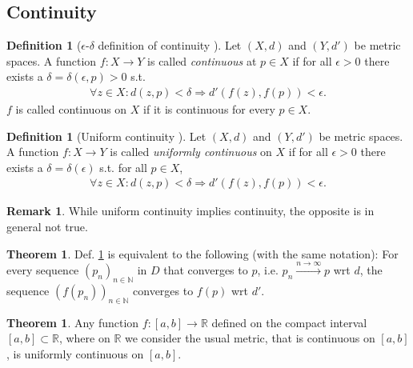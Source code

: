 \documentclass[12pt, a4paper]{article}
\numberwithin{equation}{section}
\theoremstyle{definition}
\theoremstyle{definition}
\newtheorem{defn}[thm]{Definition} %
\newtheorem{remark}[thm]{Remark} %
\newtheorem{theorem}[thm]{Theorem}
\newcommand{\seq}[1][\varphi]{\left( #1 \right)_{n \in \mathbb{N}}}
\begin{document}
	\newpage 
	\subsection{Continuity}
	\begin{defn}[$\epsilon$-$\delta$ definition of continuity \cite{MfPI}]\label{defn:continuity}
		Let $(X, d)$ and $(Y, d')$ be metric spaces. A function $f: X\rightarrow Y$ is called \textit{continuous} at $p\in X$ if for all $\epsilon > 0$ there exists a $\delta = \delta(\epsilon, p) > 0$ s.t. 
		\begin{align}
			\forall z\in X: d\left(z, p\right) < \delta \Rightarrow d'\left( f\left(z\right), f\left(p\right) \right) < \epsilon.  
		\end{align}
		$f$ is called continuous on $X$ if it is continuous for every $p\in X$.
	\end{defn}

	\begin{defn}[Uniform continuity \cite{src:uniform_continuity}]
		Let $(X, d)$ and $(Y, d')$ be metric spaces. A function $f: X\rightarrow Y$ is called \textit{uniformly continuous} on $X$ if for all $\epsilon > 0$ there exists a $\delta = \delta(\epsilon)$ s.t. for all $p\in X$,
		\begin{align}
			\forall z\in X: d\left(z, p\right) < \delta \Rightarrow d'\left( f\left(z\right), f\left(p\right) \right) < \epsilon.
		\end{align}
	\end{defn}

	\begin{remark}
		While uniform continuity implies continuity, the opposite is in general not true.
	\end{remark}

	\begin{theorem}
		Def. \ref{defn:continuity} is equivalent to the following (with the same notation): For every sequence $\seq[p_n]$ in $D$ that converges to $p$, i.e. $p_n \overset{n\to\infty}{\longrightarrow} p$ wrt $d$, the sequence $\seq[f(p_n)]$ converges to $f(p)$ wrt $d'$.
	\end{theorem}

	\begin{theorem}\label{thrm:uniform_continuity}
		Any function $f: [a, b]\to\mathbb R$ defined on the compact interval \\ $[a, b] \subset \mathbb R$, where on $\mathbb R$ we consider the usual metric, that is continuous on $[a, b]$, is uniformly continuous on  $[a, b]$.
	\end{theorem}
\end{document}
